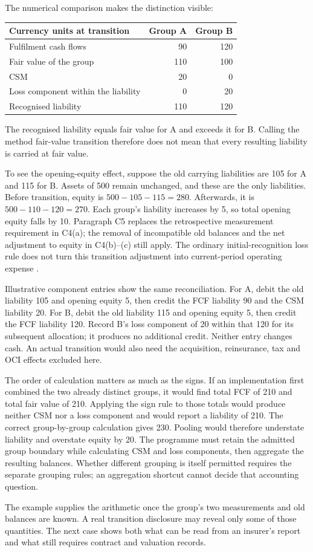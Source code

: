 The numerical comparison makes the distinction visible:
\begin{center}
\begin{tabular}{lrr}
\toprule
Currency units at transition & Group A & Group B \\
\midrule
Fulfilment cash flows & 90 & 120 \\
Fair value of the group & 110 & 100 \\
CSM & 20 & 0 \\
Loss component within the liability & 0 & 20 \\
Recognised liability & 110 & 120 \\
\bottomrule
\end{tabular}
\end{center}
The recognised liability equals fair value for A and exceeds it for B.
Calling the method fair-value transition therefore does not mean that every
resulting liability is carried at fair value.

\clearpage
To see the opening-equity effect, suppose the old carrying liabilities are
105 for A and 115 for B. Assets of 500 remain unchanged, and these are the
only liabilities. Before transition, equity is $500-105-115=280$. Afterwards,
it is $500-110-120=270$. Each group's liability increases by 5, so total
opening equity falls by 10. Paragraph C5 replaces the retrospective
measurement requirement in C4(a); the removal of incompatible old balances
and the net adjustment to equity in C4(b)--(c) still apply. The ordinary
initial-recognition loss rule does not turn this transition adjustment into
current-period operating expense \citep[paragraphs C4--C5]{aasb17}.

Illustrative component entries show the same reconciliation. For A, debit
the old liability 105 and opening equity 5, then credit the FCF liability 90
and the CSM liability 20. For B, debit the old liability 115 and opening
equity 5, then credit the FCF liability 120. Record B's loss component of 20
within that 120 for its subsequent allocation; it produces no additional
credit. Neither entry changes cash. An actual transition would also need the
acquisition, reinsurance, tax and OCI effects excluded here.

The order of calculation matters as much as the signs. If an implementation
first combined the two already distinct groups, it would find total FCF of
210 and total fair value of 210. Applying the sign rule to those totals would
produce neither CSM nor a loss component and would report a liability of 210.
The correct group-by-group calculation gives 230. Pooling would therefore
understate liability and overstate equity by 20. The programme must retain
the admitted group boundary while calculating CSM and loss components, then
aggregate the resulting balances. Whether different grouping is itself
permitted requires the separate grouping rules; an aggregation shortcut
cannot decide that accounting question.

The example supplies the arithmetic once the group's two measurements and
old balances are known. A real transition disclosure may reveal only some
of those quantities. The next case shows both what can be read from an
insurer's report and what still requires contract and valuation records.

\clearpage
